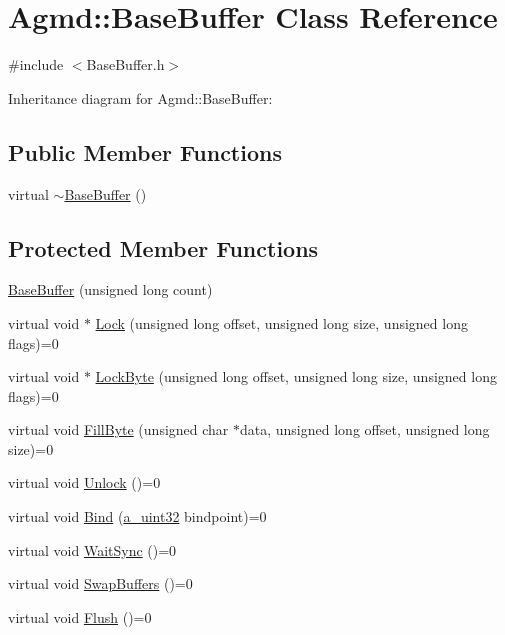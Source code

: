 \hypertarget{class_agmd_1_1_base_buffer}{\section{Agmd\+:\+:Base\+Buffer Class Reference}
\label{class_agmd_1_1_base_buffer}
}


{\ttfamily \#include $<$Base\+Buffer.\+h$>$}



Inheritance diagram for Agmd\+:\+:Base\+Buffer\+:
\subsection*{Public Member Functions}
\begin{DoxyCompactItemize}
\item 
virtual \hyperlink{class_agmd_1_1_base_buffer_ab69957780fa17eef7da0915c3f12ec77}{$\sim$\+Base\+Buffer} ()
\end{DoxyCompactItemize}
\subsection*{Protected Member Functions}
\begin{DoxyCompactItemize}
\item 
\hyperlink{class_agmd_1_1_base_buffer_ab2e642026d9013d84dba26248a09e3c5}{Base\+Buffer} (unsigned long count)
\item 
virtual void $\ast$ \hyperlink{class_agmd_1_1_base_buffer_ab3c4e881ef20a8d6d9f8d3f2d920a60e}{Lock} (unsigned long offset, unsigned long size, unsigned long flags)=0
\item 
virtual void $\ast$ \hyperlink{class_agmd_1_1_base_buffer_a0523f6a4bebacc8800d91297d20b12ca}{Lock\+Byte} (unsigned long offset, unsigned long size, unsigned long flags)=0
\item 
virtual void \hyperlink{class_agmd_1_1_base_buffer_a7bf279e968311e91e905afd7d7e2c145}{Fill\+Byte} (unsigned char $\ast$data, unsigned long offset, unsigned long size)=0
\item 
virtual void \hyperlink{class_agmd_1_1_base_buffer_afb2c7043048c1327a1b1cef6644f1878}{Unlock} ()=0
\item 
virtual void \hyperlink{class_agmd_1_1_base_buffer_a8da8efb40a86c4c48e1b9bca64de6f92}{Bind} (\hyperlink{_common_defines_8h_a964296f9770051b9e4807b1f180dd416}{a\+\_\+uint32} bindpoint)=0
\item 
virtual void \hyperlink{class_agmd_1_1_base_buffer_a9d694ef2b76825d6e496d35a2d6def6b}{Wait\+Sync} ()=0
\item 
virtual void \hyperlink{class_agmd_1_1_base_buffer_a5d698e89b12501c71dfea9f7575b3742}{Swap\+Buffers} ()=0
\item 
virtual void \hyperlink{class_agmd_1_1_base_buffer_ad4922f6545124baec94ce4bd9b4ccceb}{Flush} ()=0
\end{DoxyCompactItemize}
